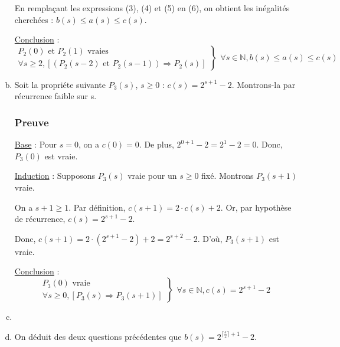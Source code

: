 \documentclass[12pt,a4paper]{article}
\begin{document}
\begin{enumerate}[a)]
En rempla\c{c}ant les expressions (3), (4) et (5) en (6), on obtient les in\'egalit\'es cherch\'ees : 
$ b(s) \leq a(s) \leq c(s) $.

\medskip
\underline{Conclusion} : 
\begin{equation*}
\left .\begin{array}{l}
P_{2}(0) \text{ et } P_{2}(1) \text{ vraies } \\
\forall s \geq 2, [(P_{2}(s-2) \text{ et } P_{2}(s-1)) \Rightarrow P_{2}(s) ]
\end{array} \right \}
\left .\begin{array}{l}
\forall s \in \mathbb{N}, b(s) \leq a(s) \leq c(s)
\end{array}\right .
\end{equation*}

\item Soit la propri\'ete suivante \( P_{3}(s) \), $s \geq 0$ : $c(s) = 2^{s+1} - 2$.
Montrons-la par r\'ecurrence faible sur s.

\subsubsection*{Preuve}
\underline{Base} : Pour \( s = 0\), on a $c(0) = 0 $. De plus, $ 2^{0+1} - 2 = 2^1 - 2 = 0$. Donc, $P_{3}(0)$ est vraie.

\medskip
\underline{Induction} : Supposons \( P_{3}(s) \) vraie pour un \( s \geq 0 \) fix\'e. Montrons \( P_{3}(s+1) \) vraie.

On a $ s+1 \geq 1 $. 
Par d\'efinition, $c(s+1) = 2\cdot c(s) + 2$. Or, par hypoth\`ese de r\'ecurrence, $c(s) = 2^{s+1} - 2$.

Donc, $c(s+1) = 2 \cdot (2^{s+1} - 2) + 2 = 2^{s+2} - 2$. D'o\`u, $P_{3}(s+1)$ est vraie.

\medskip
\underline{Conclusion} : 
\begin{equation*}
\left .\begin{array}{l}
P_{3}(0) \text{ vraie } \\
\forall s \geq 0, [P_{3}(s) \Rightarrow P_{3}(s+1) ]
\end{array} \right \}
\left .\begin{array}{l}
\forall s \in \mathbb{N}, c(s) = 2^{s+1} - 2
\end{array}\right .
\end{equation*}

\item {}

\item On d\'eduit des deux questions pr\'ec\'edentes que $ b(s) = 2^{\lceil \frac{s}{2} \rceil + 1} - 2 $.


\end{enumerate}
\end{document}
